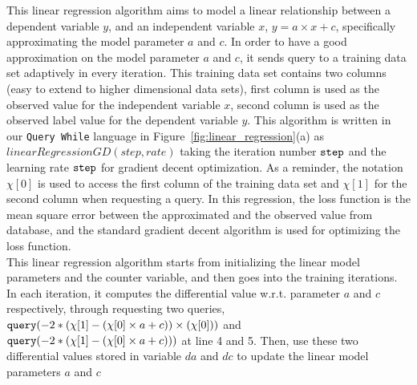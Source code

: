 This linear regression algorithm 
aims to
model a linear relationship between a dependent variable $y$,
and an independent variable $x$, $y = a \times x + c$, specifically approximating the 
model parameter $a$ and $c$.
In order to have a good approximation on the model parameter 
$a$ and $c$, 
it sends query to a training data set adaptively in every iteration.
This training data set contains two columns (easy to extend to higher dimensional data sets), first column is used as the observed value for the independent variable $x$,
second column is used as the observed label value for the dependent variable $y$.
This algorithm is written in our {\tt Query While} language in Figure~\ref{fig:linear_regression}(a) as $linearRegressionGD(step, rate)$ taking the iteration number $\mathtt{step}$ 
and the learning rate $\mathtt{step}$ for gradient decent optimization.
As a reminder,
the notation 
$\chi[0]$ is used to access the first column of the training data set
and $\chi[1]$ for 
the second column when requesting a query.
In this regression, the loss function is the mean square error between the approximated and the observed value from database,
and the standard gradient decent algorithm is used for optimizing the loss function.
%
\\
This linear regression algorithm starts from initializing the linear model parameters and the counter variable,
and then goes into the training iterations.
In each iteration, it computes the differential value w.r.t. parameter
$a$ and $c$ respectively,
through requesting two queries, ${\tt query}(-2 * (\chi[1] - (\chi[0]\times a + c)) \times (\chi[0]))$ and 
${\tt query}(-2 * (\chi[1] - (\chi[0]\times a + c)))$
at line 4 and 5.
Then, use these two differential values stored in variable $da$ and $dc$ to update the linear model parameters $a$ and $c$ 
